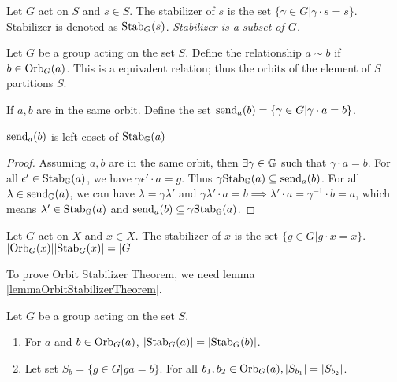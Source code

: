 \documentclass[../note.tex]{subfiles}
\begin{document}
\begin{definition}[Stabilizer]\label{def:stabilizer} 
	Let $G$ act on $S$ and $s \in S$. The stabilizer of $s$ is the set $\{\gamma \in G | \gamma\cdot s = s\}$. Stabilizer is denoted as $\text{Stab}_{G}({s})$.
	\emph{Stabilizer is a subset of $G$.}
\end{definition}

\begin{theorem}
	Let $G$ be a group acting on the set $S$.
	Define the relationship $a\sim b$ if $b\in \text{Orb}_{G}({a})$.
	This is a equivalent relation; thus the orbits of the element of $S$ partitions $S$.
\end{theorem}

\begin{definition}[Send x]
	If $a,b$ are in the same orbit. Define the set $\text{send}_{a}({b})=\{\gamma\in G| \gamma \cdot a=b \}$.
\end{definition}

\begin{lemma}
$\text{send}_{a}({b})$ is left coset of $\text{Stab}_{\mathbb{G}}({a})$
\end{lemma}

\begin{proof}
	Assuming $a,b$ are in the same orbit, then $\exists \gamma \in \mathbb{G}$ such that $\gamma \cdot a = b$. 
	For all $\epsilon' \in \text{Stab}_{\mathbb{G}}({a})$, we have $\gamma \epsilon' \cdot a = g $. Thus $\gamma\text{Stab}_{\mathbb{G}}({a}) \subseteq \text{send}_{a}({b})$.
	For all $\lambda \in \text{send}_{\mathbb{G}}({a})$, we can have  $\lambda = \gamma\lambda'$ and $\gamma\lambda' \cdot a = b \implies \lambda' \cdot a = \gamma^{-1} \cdot b=a$, which means $\lambda' \in \text{Stab}_{\mathbb{G}}({a})$ and $\text{send}_{a}({b}) \subseteq \gamma\text{Stab}_{\mathbb{G}}({a})$.
\end{proof}

\begin{theorem}
	Let $G$ act on $X$ and $x \in X$. The stabilizer of $x$ is the set $\{g \in G | g\cdot x = x\}$.
	$|\text{Orb}_{G}({x})||\text{Stab}_{G}({x})|=|G|$
\end{theorem}

To prove Orbit Stabilizer Theorem, we need lemma \ref{lemmaOrbitStabilizerTheorem}.

\begin{lemma}\label{lemmaOrbitStabilizerTheorem}
	Let $G$ be a group acting on the set $S$.
\begin{enumerate}
	\item For $a$ and $b\in \text{Orb}_{G}({a})$, $|\text{Stab}_{G}({a})|=|\text{Stab}_{G}({b})|$.
	\item Let set $S_b=\{g\in G| ga=b \}$. For all $b_1, b_2 \in \text{Orb}_{G}({a}), |S_{b_1}|=|S_{b_2}|$.
\end{enumerate}
\end{lemma}
\end{document}
